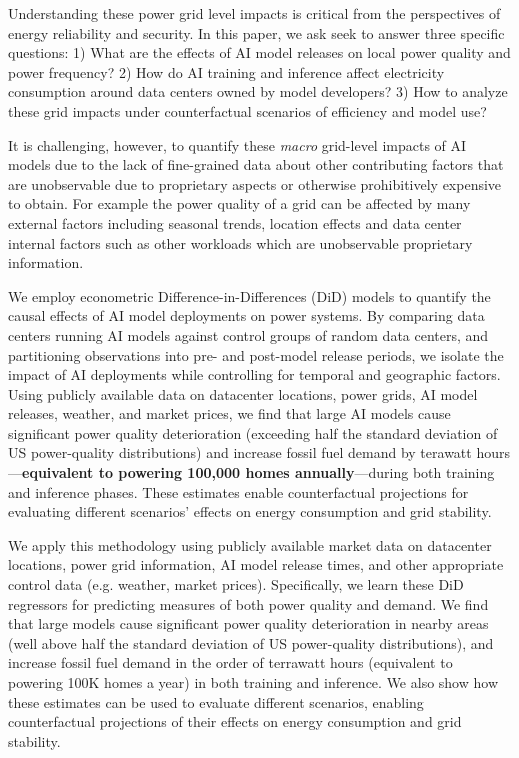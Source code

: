 \documentclass[sigconf,authordraft]{acmart}
\begin{document}
Understanding these power grid level impacts is critical from the perspectives of energy reliability and security. In this paper, we ask seek to answer three specific questions: 1) What are the effects of AI model releases on local power quality and power frequency? 2) How do AI training and inference affect electricity consumption around data centers owned by model developers? 3) How to analyze these grid impacts under counterfactual scenarios of efficiency and model use?

It is challenging, however, to quantify these \emph{macro} grid-level impacts of AI models due to the lack of fine-grained data about other contributing factors that are unobservable due to proprietary aspects or otherwise prohibitively expensive to obtain. For example the power quality of a grid can be affected by many external factors including seasonal trends, location effects and data center internal factors such as other workloads which are unobservable proprietary information. 

We employ econometric Difference-in-Differences (DiD) models to quantify the causal effects of AI model deployments on power systems. By comparing data centers running AI models against control groups of random data centers, and partitioning observations into pre- and post-model release periods, we isolate the impact of AI deployments while controlling for temporal and geographic factors. Using publicly available data on datacenter locations, power grids, AI model releases, weather, and market prices, we find that large AI models cause significant power quality deterioration (exceeding half the standard deviation of US power-quality distributions) and increase fossil fuel demand by terawatt hours---\textbf{equivalent to powering 100,000 homes annually}---during both training and inference phases. These estimates enable counterfactual projections for evaluating different scenarios' effects on energy consumption and grid stability.

We apply this methodology using publicly available market data on datacenter locations, power grid information, AI model release times, and other appropriate control data (e.g. weather, market prices). Specifically, we learn these DiD regressors for predicting measures of both power quality and demand. 
We find that large models cause significant power quality deterioration in nearby areas (well above half the standard deviation of US power-quality distributions), and increase fossil fuel demand in the order of terrawatt hours (equivalent to powering 100K homes a year) in both training and inference. We also show how these estimates can be used to evaluate different scenarios, enabling counterfactual projections of their effects on energy consumption and grid stability. 
\end{document}
